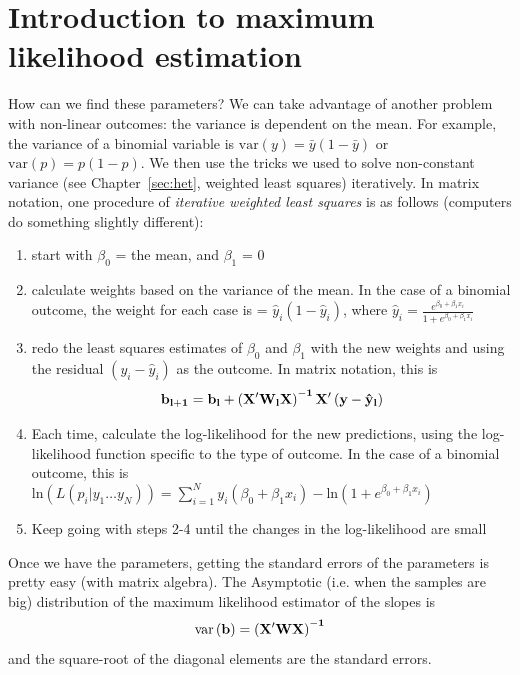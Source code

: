 \section{Introduction to maximum likelihood estimation}

How can we find these parameters? We can take advantage of another problem with non-linear outcomes: the variance is dependent on the mean. For example, the variance of a binomial variable is $\mbox{var}\left(y\right)=\bar{y}\left(1-\bar{y}\right)$ or $\mbox{var}\left(p\right)=p\left(1-p\right)$. We then use the tricks we used to solve non-constant variance (see Chapter~\ref{sec:het}, weighted least squares) iteratively. In matrix notation, one procedure of {\it iterative weighted least squares} is as follows (computers do something slightly different):
\begin{enumerate}
\item{start with $\beta_0$ = the mean, and $\beta_1$ = 0}
\item{calculate weights based on the variance of the mean. In the case of a binomial outcome, the weight for each case is = $\hat{y}_i\left(1-\hat{y}_i\right)$}, where $\hat{y}_i=\frac{e^{\beta_0+\beta_1x_i}}{1+e^{\beta_0+\beta_1x_i}}$
\item{redo the least squares estimates of $\beta_0$ and $\beta_1$ with the new weights and using the residual $(y_i-\hat{y}_i)$ as the outcome. In matrix notation, this is}
\begin{equation}
{\bf{b}_{l+1}} ={\bf{b}_{l}} + {\bf{\left(X'W_lX\right)^{-1}X'\left(y-\hat{y}_l\right)}}
\end{equation}
\item{Each time, calculate the log-likelihood for the new predictions, using the log-likelihood function specific to the type of outcome. In the case of a binomial outcome, this is $\mbox{ln}\left(L\left(p_i \vert y_1 \ldots y_N\right)\right)=\sum_{i=1}^N y_i\left(\beta_0+\beta_1x_i\right)-\mbox{ln}\left(1+e^{\beta_0+\beta_1x_i}\right)$}
\item{Keep going with steps 2-4 until the changes in the log-likelihood are small}
\end{enumerate}

Once we have the parameters, getting the standard errors of the parameters is pretty easy (with matrix algebra). The Asymptotic (i.e. when the samples are big) distribution of the maximum likelihood estimator of the slopes is
\begin{equation}\label{eq:glmmatrixvar}
\mbox{var}\left({\bf b}\right) = {\bf{\left(X'WX\right)^{-1}}}
\end{equation}
and the square-root of the diagonal elements are the standard errors.

